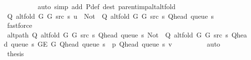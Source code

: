\begin{isabellebody}
\ \ \ \ \ \ \ \ \ \ {\isacharparenleft}{\kern0pt}auto\ simp\ add{\isacharcolon}{\kern0pt}\ P{\isacharprime}{\kern0pt}{\isacharunderscore}{\kern0pt}def\ dest{\isacharcolon}{\kern0pt}\ parent{\isacharunderscore}{\kern0pt}imp{\isacharunderscore}{\kern0pt}alt{\isacharunderscore}{\kern0pt}alt{\isacharunderscore}{\kern0pt}fold{\isacharparenright}{\kern0pt}\isanewline
\ \ \ \ \ \ \isamarkupfalse%
\ \isamarkupfalse%
\ {\isachardoublequoteopen}Q\ {\isacharparenleft}{\kern0pt}alt{\isacharunderscore}{\kern0pt}fold\ G{}\ G{}\ src\ s{\isacharparenright}{\kern0pt}\ u\ {\isacharequal}{\kern0pt}\ Not\ {\isasymcirc}\ Q\ {\isacharparenleft}{\kern0pt}alt{\isacharunderscore}{\kern0pt}fold\ G{}\ G{}\ src\ s{\isacharparenright}{\kern0pt}\ {\isacharparenleft}{\kern0pt}Q{\isacharunderscore}{\kern0pt}head\ {\isacharparenleft}{\kern0pt}queue\ s{\isacharparenright}{\kern0pt}{\isacharparenright}{\kern0pt}{\isachardoublequoteclose}\isanewline
\ \ \ \ \ \ \ \ \isamarkupfalse%
\ fastforce\isanewline
\ \ \ \ \ \ \isamarkupfalse%
\ \isamarkupfalse%
\ {\isachardoublequoteopen}alt{\isacharunderscore}{\kern0pt}path\ {\isacharparenleft}{\kern0pt}Q\ {\isacharparenleft}{\kern0pt}alt{\isacharunderscore}{\kern0pt}fold\ G{}\ G{}\ src\ s{\isacharparenright}{\kern0pt}\ {\isacharparenleft}{\kern0pt}Q{\isacharunderscore}{\kern0pt}head\ {\isacharparenleft}{\kern0pt}queue\ s{\isacharparenright}{\kern0pt}{\isacharparenright}{\kern0pt}{\isacharparenright}{\kern0pt}\ {\isacharparenleft}{\kern0pt}Not\ {\isasymcirc}\ Q\ {\isacharparenleft}{\kern0pt}alt{\isacharunderscore}{\kern0pt}fold\ G{}\ G{}\ src\ s{\isacharparenright}{\kern0pt}\ {\isacharparenleft}{\kern0pt}Q{\isacharunderscore}{\kern0pt}head\ {\isacharparenleft}{\kern0pt}queue\ s{\isacharparenright}{\kern0pt}{\isacharparenright}{\kern0pt}{\isacharparenright}{\kern0pt}\ {\isacharparenleft}{\kern0pt}G{\isachardot}{\kern0pt}E\ G{\isacharparenright}{\kern0pt}\ {\isacharparenleft}{\kern0pt}Q{\isacharunderscore}{\kern0pt}head\ {\isacharparenleft}{\kern0pt}queue\ s{\isacharparenright}{\kern0pt}\ {\isacharhash}{\kern0pt}\ p{\isacharparenright}{\kern0pt}\ {\isacharparenleft}{\kern0pt}Q{\isacharunderscore}{\kern0pt}head\ {\isacharparenleft}{\kern0pt}queue\ s{\isacharparenright}{\kern0pt}{\isacharparenright}{\kern0pt}\ v{\isachardoublequoteclose}\isanewline
\ \ \ \ \ \ \ \ \isamarkupfalse%
\ auto\isanewline
\ \ \ \ \ \ \isamarkupfalse%
\ {\isacharquery}{\kern0pt}thesis\isanewline

\end{isabellebody}
